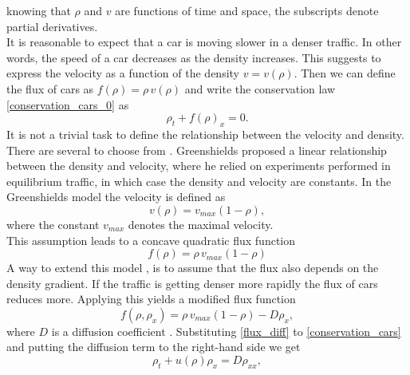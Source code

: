 \documentclass[../include.tex]{subfiles}
\begin{document}
knowing that $ \rho $ and $ v $ are functions of time and space, the subscripts denote partial derivatives.\\
It is reasonable to expect that a car is moving slower in a denser traffic. In other words, the speed of a car decreases as the density increases. This suggests to express the velocity as a function of the density $ v = v(\rho) $. Then we can define the flux of cars as $ f(\rho) = \rho\,v(\rho) $ and write the conservation law \eqref{conservation_cars_0} as
\begin{equation}
	\rho_t + f(\rho)_x = 0.
	\label{conservation_cars}
\end{equation}
It is not a trivial task to define the relationship between the velocity and density. There are several to choose from \cite{kachroo-sastry, trafficmono}.  Greenshields \cite{greenshields} proposed a linear relationship between the density and velocity, where he relied on experiments performed in equilibrium traffic, in which case the density and velocity are constants. In the Greenshields model the velocity is defined as
\begin{equation}
	\label{greenshields}
	v(\rho) = v_{max}(1-\rho),
\end{equation}
where the constant $ v_{max} $ denotes the maximal velocity.\\
This assumption leads to a concave quadratic flux function
\[
f(\rho) = \rho\, v_{max} \left(1 - \rho \right) 
\]
A way to extend this model \cite{whitham}, is to assume that the flux also depends on the density gradient. If the traffic is getting denser more rapidly the flux of cars reduces more. Applying this yields a modified flux function
\begin{equation}
	f(\rho, \rho_x) = \rho\,v_{max} \left(1 - \rho\right) - D \rho_x,
	\label{flux_diff}
\end{equation}
where $ D $ is a diffusion coefficient \cite{whitham, kachroo-sastry, trafficmono}. Substituting \eqref{flux_diff} to \eqref{conservation_cars} and putting the diffusion term to the right-hand side we get
\begin{equation}
	\rho_t + u(\rho)\rho_x = D \rho_{xx},
	\label{traffic}
\end{equation}
\end{document}
